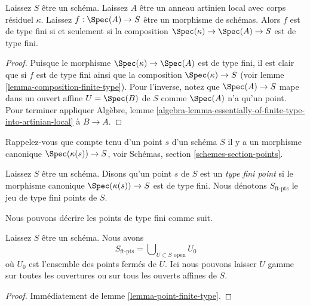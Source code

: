 \begin{lemma}

\label{lemma-artinian-finite-type}
Laissez $S$ être un schéma. Laissez $A$ être un anneau artinien local avec corps résiduel $\kappa$. Laissez $f : \Spec(A) \to S$ être un morphisme de schémas. Alors $f$ est de type fini si et seulement si la composition $\Spec(\kappa) \to \Spec(A) \to S$ est de type fini.
\end{lemma}

\begin{proof}
Puisque le morphisme $\Spec(\kappa) \to \Spec(A)$ est de type fini, il est clair que si $f$ est de type fini ainsi que la composition $\Spec(\kappa) \to S$ (voir lemme \ref{lemma-composition-finite-type}). Pour l'inverse, notez que $\Spec(A) \to S$ mape dans un ouvert affine $U = \Spec(B)$ de $S$ comme $\Spec(A)$ n'a qu'un point. Pour terminer appliquer Algèbre, lemme \ref{algebra-lemma-essentially-of-finite-type-into-artinian-local} à $B \to A$.
\end{proof}

\noindent
Rappelez-vous que compte tenu d'un point $s$ d'un schéma $S$ il y a un morphisme canonique $\Spec(\kappa(s)) \to S$, voir Schémas, section \ref{schemes-section-points}.

\begin{definition}

\label{definition-finite-type-point}
Laissez $S$ être un schéma. Disons qu'un point $s$ de $S$ est un {\it type fini point} si le morphisme canonique $\Spec(\kappa(s)) \to S$ est de type fini. Nous dénotons $S_{\text{ft-pts}}$ le jeu de type fini points de $S$.
\end{definition}

\noindent
Nous pouvons décrire les points de type fini comme suit.

\begin{lemma}

\label{lemma-identify-finite-type-points}
Laissez $S$ être un schéma. Nous avons $$
S_{\text{ft-pts}} = \bigcup\nolimits_{U \subset S\text{ open}} U_0
$$ où $U_0$ est l'ensemble des points fermés de $U$. Ici nous pouvons laisser $U$ gamme sur toutes les ouvertures ou sur tous les ouverts affines de $S$.
\end{lemma}

\begin{proof}

Immédiatement de lemme \ref{lemma-point-finite-type}.

\end{proof}

